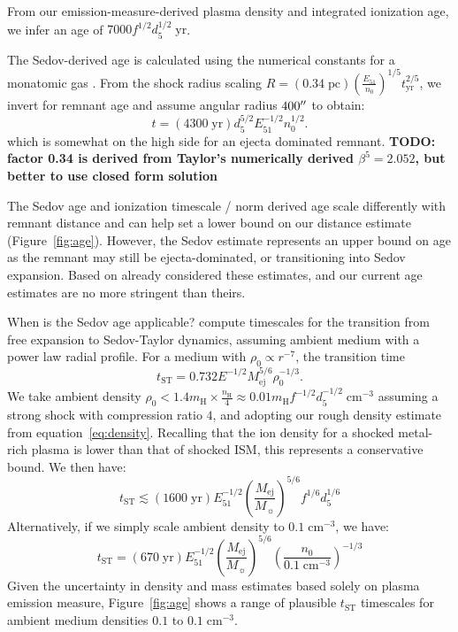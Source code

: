 \documentclass[preprint2,tighten,trackchanges]{aastex6}
\newcommand*{\mt}{\mathrm}
\newcommand*{\unit}[1]{\;\mt{#1}}  %
\begin{document}
From our emission-measure-derived plasma density and integrated ionization age,
we infer an age of $7000 f^{1/2} d_{5}^{1/2} \unit{yr}$.

The Sedov-derived age \citep{taylor1950, sedov1959} is calculated using the
numerical constants for a monatomic gas \citet{taylor1950-pt2}.
From the shock radius scaling
$R = (0.34 \unit{pc}) \left( \frac{E_{51}}{n_0} \right)^{1/5} t_{\mt{yr}}^{2/5}$,
we invert for remnant age and assume angular radius $400\mbox{$^{\prime\prime}$}$ to obtain:
\[
    t = (4300 \unit{yr}) d_5^{5/2} E_{51}^{-1/2} n_0^{1/2} .
\]
which is somewhat on the high side for an ejecta dominated remnant.
\textbf{TODO: factor 0.34 is derived from Taylor's numerically derived
$\beta^5 = 2.052$, but better to use closed form solution}

The Sedov age and ionization timescale / norm derived age scale differently
with remnant distance and can help set a lower bound on our distance estimate
(Figure~\ref{fig:age}).
However, the Sedov estimate represents an upper bound on age as the remnant
may still be ejecta-dominated, or transitioning into Sedov expansion.
Based on
\citet{rakowski2001} already considered these estimates, and our current age
estimates are no more stringent than theirs.

When is the Sedov age applicable?
\citet{truelove1999} compute timescales for the transition from free expansion
to Sedov-Taylor dynamics, assuming ambient medium with a power law radial
profile.
For a medium with $\rho_0 \propto r^{-7}$, the transition time
\[
    t_{\mt{ST}} = 0.732 E^{-1/2} M_{\mt{ej}}^{5/6} \rho_0^{-1/3} .
\]
We take ambient density
$\rho_0 < 1.4 m_{\mt{H}} \times \frac{n_{\mt{H}}}{4}
 \approx 0.01 m_{\mt{H}} f^{-1/2} d_{5}^{-1/2} \unit{cm^{-3}}$
assuming a strong shock with compression ratio $4$, and adopting our rough
density estimate from equation~\eqref{eq:density}.
Recalling that the ion density for a shocked metal-rich plasma is lower than
that of shocked ISM, this represents a conservative bound.
We then have:
\[
    t_{\mt{ST}} \lesssim (1600 \unit{yr})
                         E_{\mt{51}}^{-1/2}
                         \left( \frac{M_{\mt{ej}}}{M_{\sun}} \right)^{5/6}
                         f^{1/6} d_{5}^{1/6}
\]
Alternatively, if we simply scale ambient density to $0.1 \unit{cm^{-3}}$, we have:
\begin{equation} \label{eq:sttime-generic}
    t_{\mt{ST}} = (670 \unit{yr})
                  E_{\mt{51}}^{-1/2}
                  \left( \frac{M_{\mt{ej}}}{M_{\sun}} \right)^{5/6}
                  \left( \frac{n_0}{0.1 \unit{cm^{-3}}} \right)^{-1/3}
\end{equation}
Given the uncertainty in density and mass estimates based solely on plasma
emission measure, Figure~\ref{fig:age} shows a range of plausible $t_{\mt{ST}}$
timescales for ambient medium densities $0.1$ to $0.1 \unit{cm^{-3}}$.
\end{document}
